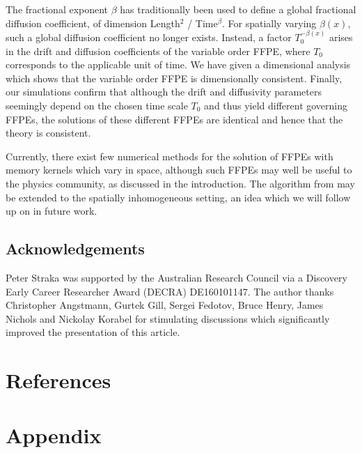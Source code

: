 \documentclass[a4paper,12pt]{elsarticle}
\numberwithin{equation}{section}
\theoremstyle{plain}
\theoremstyle{definition}
\theoremstyle{remark}
\numberwithin{equation}{section}
\newcommand{\1}{\mathbf 1}
\begin{document}
The fractional exponent $\beta$ has traditionally been used to define a global fractional diffusion coefficient, of dimension Length$^2$ / Time$^\beta$.  For spatially varying $\beta(x)$, such a global diffusion coefficient no longer exists.  
Instead, a factor $T_0^{-\beta(x)}$ arises in the drift and diffusion 
coefficients of the variable order FFPE, where $T_0$ corresponds to the applicable unit of time.  We have given a dimensional analysis which shows that the variable order FFPE is dimensionally consistent.  Finally, our simulations confirm that although the drift and diffusivity parameters seemingly depend on the chosen time scale $T_0$ and thus yield different governing FFPEs, the solutions of these different FFPEs are identical and hence that the theory is consistent. 

Currently, there exist few numerical methods for the solution of FFPEs with memory kernels which vary in space, although such FFPEs may well be useful to the physics community, as discussed in the introduction.  The algorithm from \cite{Gill2016} may be extended to the spatially inhomogeneous setting, an idea which we will follow up on in future work. 


\subsection*{Acknowledgements}
Peter Straka was supported by the Australian Research Council via a 
Discovery Early Career Researcher Award (DECRA) DE160101147. 
The author thanks Christopher Angstmann, Gurtek Gill, 
Sergei Fedotov, Bruce Henry, James Nichols and Nickolay Korabel for stimulating discussions which 
significantly improved the presentation of this article. 

\section*{References}



\appendix

\section{Appendix}
\end{document}
